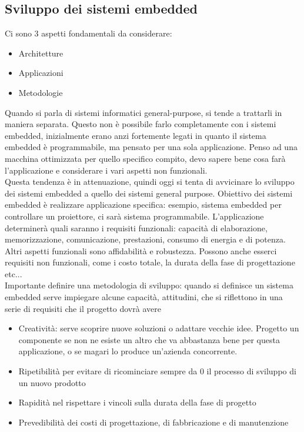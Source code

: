 \documentclass{article}
\begin{document}
\subsection{Sviluppo dei sistemi embedded}
Ci sono 3 aspetti fondamentali da considerare:
\begin{itemize}
\item Architetture
\item Applicazioni
\item Metodologie
\end{itemize}
Quando si parla di sistemi informatici general-purpose, si tende a trattarli in maniera separata. Questo non è possibile farlo completamente con i sistemi embedded, inizialmente erano anzi fortemente legati in quanto il sistema embedded è programmabile, ma pensato per una sola applicazione. Penso ad una macchina ottimizzata per quello specifico compito, devo sapere bene cosa farà l'applicazione e considerare i vari aspetti non funzionali.\\ Questa tendenza è in attenuazione, quindi oggi si tenta di avvicinare lo sviluppo dei sistemi embedded a quello dei sistemi general purpose. Obiettivo dei sistemi embedded è realizzare applicazione specifica: esempio, sistema embedded per controllare un proiettore, ci sarà sistema programmabile. L'applicazione determinerà quali saranno i requisiti funzionali: capacità di elaborazione, memorizzazione, comunicazione, prestazioni, consumo di energia e di potenza. Altri aspetti funzionali sono affidabilità e robustezza. Possono anche esserci requisiti non funzionali, come i costo totale, la durata della fase di progettazione etc...\\ Importante definire una metodologia di sviluppo: quando si definisce un sistema embedded serve impiegare alcune capacità, attitudini, che si riflettono in una serie di requisiti che il progetto dovrà avere
\begin{itemize}
\item Creatività: serve scoprire nuove soluzioni o adattare vecchie idee. Progetto un componente se non ne esiste un altro che va abbastanza bene per questa applicazione, o se magari lo produce un'azienda concorrente.
\item Ripetibilità per evitare di ricominciare sempre da 0 il processo di sviluppo di un nuovo prodotto
\item Rapidità nel rispettare i vincoli sulla durata della fase di progetto
\item Prevedibilità dei costi di progettazione, di fabbricazione e di manutenzione
\end{itemize}
\end{document}
